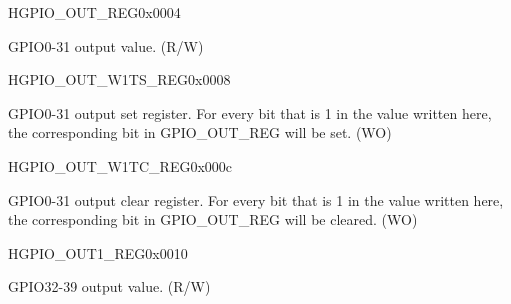 \begin{register}{H}{GPIO\_OUT\_REG}{0x0004}\label{regdesc:GPIOOUTREG}
%
\regnewline%
\begin{regdesc}\begin{reglist}
\item [GPIO\_OUT\_REG]GPIO0-31 output value. (R/W)
\end{reglist}\end{regdesc}
\end{register}


\begin{register}{H}{GPIO\_OUT\_W1TS\_REG}{0x0008}\label{regdesc:GPIOOUTW1TSREG}
%
\regnewline%
\begin{regdesc}\begin{reglist}
\item [GPIO\_OUT\_W1TS\_REG]GPIO0-31 output set register. For every bit that is 1 in the value written here, the corresponding bit in GPIO\_OUT\_REG will be set. (WO)
\end{reglist}\end{regdesc}
\end{register}


\begin{register}{H}{GPIO\_OUT\_W1TC\_REG}{0x000c}\label{regdesc:GPIOOUTW1TCREG}
%
\regnewline%
\begin{regdesc}\begin{reglist}
\item [GPIO\_OUT\_W1TC\_REG]GPIO0-31 output clear register. For every bit that is 1 in the value written here, the corresponding bit in GPIO\_OUT\_REG will be cleared. (WO)
\end{reglist}\end{regdesc}
\end{register}


\begin{register}{H}{GPIO\_OUT1\_REG}{0x0010}\label{regdesc:GPIOOUT1REG}
%
%
\regnewline%
\begin{regdesc}\begin{reglist}
\item [GPIO\_OUT\_DATA]GPIO32-39 output value. (R/W)
\end{reglist}\end{regdesc}
\end{register}


